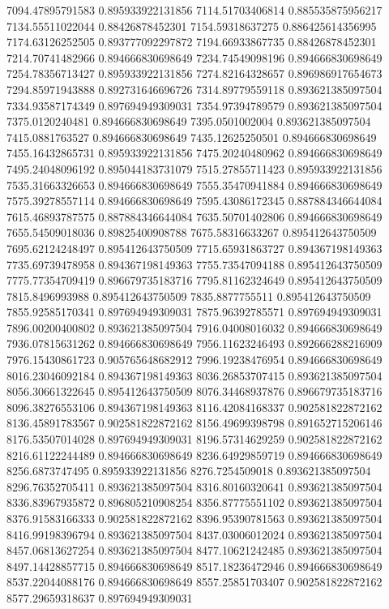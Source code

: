 {7094.47895791583 0.895933922131856
7114.51703406814 0.885535875956217
7134.55511022044 0.88426878452301
7154.59318637275 0.886425614356995
7174.63126252505 0.893777092297872
7194.66933867735 0.88426878452301
7214.70741482966 0.894666830698649
7234.74549098196 0.894666830698649
7254.78356713427 0.895933922131856
7274.82164328657 0.896986917654673
7294.85971943888 0.892731646696726
7314.89779559118 0.893621385097504
7334.93587174349 0.897694949309031
7354.97394789579 0.893621385097504
7375.0120240481 0.894666830698649
7395.0501002004 0.893621385097504
7415.0881763527 0.894666830698649
7435.12625250501 0.894666830698649
7455.16432865731 0.895933922131856
7475.20240480962 0.894666830698649
7495.24048096192 0.895044183731079
7515.27855711423 0.895933922131856
7535.31663326653 0.894666830698649
7555.35470941884 0.894666830698649
7575.39278557114 0.894666830698649
7595.43086172345 0.887884346644084
7615.46893787575 0.887884346644084
7635.50701402806 0.894666830698649
7655.54509018036 0.89825400908788
7675.58316633267 0.895412643750509
7695.62124248497 0.895412643750509
7715.65931863727 0.894367198149363
7735.69739478958 0.894367198149363
7755.73547094188 0.895412643750509
7775.77354709419 0.896679735183716
7795.81162324649 0.895412643750509
7815.8496993988 0.895412643750509
7835.8877755511 0.895412643750509
7855.92585170341 0.897694949309031
7875.96392785571 0.897694949309031
7896.00200400802 0.893621385097504
7916.04008016032 0.894666830698649
7936.07815631262 0.894666830698649
7956.11623246493 0.892666288216909
7976.15430861723 0.905765648682912
7996.19238476954 0.894666830698649
8016.23046092184 0.894367198149363
8036.26853707415 0.893621385097504
8056.30661322645 0.895412643750509
8076.34468937876 0.896679735183716
8096.38276553106 0.894367198149363
8116.42084168337 0.902581822872162
8136.45891783567 0.902581822872162
8156.49699398798 0.891652715206146
8176.53507014028 0.897694949309031
8196.57314629259 0.902581822872162
8216.61122244489 0.894666830698649
8236.64929859719 0.894666830698649
8256.6873747495 0.895933922131856
8276.7254509018 0.893621385097504
8296.76352705411 0.893621385097504
8316.80160320641 0.893621385097504
8336.83967935872 0.896805210908254
8356.87775551102 0.893621385097504
8376.91583166333 0.902581822872162
8396.95390781563 0.893621385097504
8416.99198396794 0.893621385097504
8437.03006012024 0.893621385097504
8457.06813627254 0.893621385097504
8477.10621242485 0.893621385097504
8497.14428857715 0.894666830698649
8517.18236472946 0.894666830698649
8537.22044088176 0.894666830698649
8557.25851703407 0.902581822872162
8577.29659318637 0.897694949309031
}
